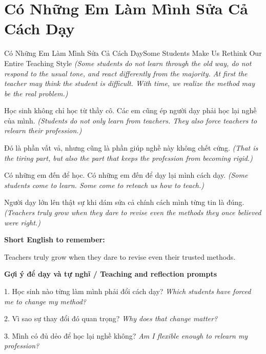 \section{Có Những Em Làm Mình Sửa Cả Cách Dạy}
\begin{truyen}{Có Những Em Làm Mình Sửa Cả Cách Dạy}{Some Students Make Us Rethink Our Entire Teaching Style}
\textit{(Some students do not learn through the old way, do not respond to the usual tone, and react differently from the majority. At first the teacher may think the student is difficult. With time, we realize the method may be the real problem.)}

Học sinh không chỉ học từ thầy cô. Các em cũng ép người dạy phải học lại nghề của mình.
\textit{(Students do not only learn from teachers. They also force teachers to relearn their profession.)}

Đó là phần vất vả, nhưng cũng là phần giúp nghề này không chết cứng.
\textit{(That is the tiring part, but also the part that keeps the profession from becoming rigid.)}

Có những em đến để học. Có những em đến để dạy lại mình cách dạy.
\textit{(Some students come to learn. Some come to reteach us how to teach.)}

\end{truyen}

\begin{baihoc}
Người dạy lớn lên thật sự khi dám sửa cả chính cách mình từng tin là đúng.
\textit{(Teachers truly grow when they dare to revise even the methods they once believed were right.)}
\end{baihoc}

\begin{ghinhoanh}
\textbf{Short English to remember:}

Teachers truly grow when they dare to revise even their trusted methods.

\end{ghinhoanh}

\begin{tuhocnhanh}
\textbf{Gợi ý để dạy và tự nghĩ / Teaching and reflection prompts}

1. Học sinh nào từng làm mình phải đổi cách dạy? \textit{Which students have forced me to change my method?}

2. Vì sao sự thay đổi đó quan trọng? \textit{Why does that change matter?}

3. Mình có đủ dẻo để học lại nghề không? \textit{Am I flexible enough to relearn my profession?}
\end{tuhocnhanh}
\ngancach

